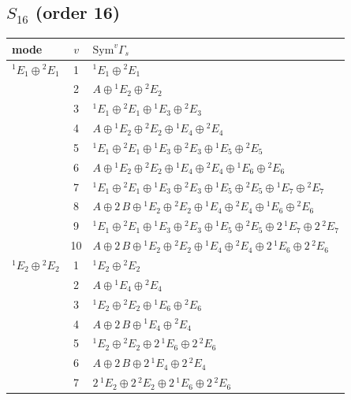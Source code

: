\documentclass[11pt]{article}
\begin{document}
\subsection*{$S_{16}$ \quad (order 16)}
\begin{longtable}{l c p{}}
\hline mode & $v$ & $\mathrm{Sym}^v\Gamma_s$\\ \hline\endhead
${}^{1}E_{1}\oplus {}^{2}E_{1}$ & 1 & ${}^{1}E_{1}\oplus {}^{2}E_{1}$\\
 & 2 & $A\oplus {}^{1}E_{2}\oplus {}^{2}E_{2}$\\
 & 3 & ${}^{1}E_{1}\oplus {}^{2}E_{1}\oplus {}^{1}E_{3}\oplus {}^{2}E_{3}$\\
 & 4 & $A\oplus {}^{1}E_{2}\oplus {}^{2}E_{2}\oplus {}^{1}E_{4}\oplus {}^{2}E_{4}$\\
 & 5 & ${}^{1}E_{1}\oplus {}^{2}E_{1}\oplus {}^{1}E_{3}\oplus {}^{2}E_{3}\oplus {}^{1}E_{5}\oplus {}^{2}E_{5}$\\
 & 6 & $A\oplus {}^{1}E_{2}\oplus {}^{2}E_{2}\oplus {}^{1}E_{4}\oplus {}^{2}E_{4}\oplus {}^{1}E_{6}\oplus {}^{2}E_{6}$\\
 & 7 & ${}^{1}E_{1}\oplus {}^{2}E_{1}\oplus {}^{1}E_{3}\oplus {}^{2}E_{3}\oplus {}^{1}E_{5}\oplus {}^{2}E_{5}\oplus {}^{1}E_{7}\oplus {}^{2}E_{7}$\\
 & 8 & $A\oplus 2\,B\oplus {}^{1}E_{2}\oplus {}^{2}E_{2}\oplus {}^{1}E_{4}\oplus {}^{2}E_{4}\oplus {}^{1}E_{6}\oplus {}^{2}E_{6}$\\
 & 9 & ${}^{1}E_{1}\oplus {}^{2}E_{1}\oplus {}^{1}E_{3}\oplus {}^{2}E_{3}\oplus {}^{1}E_{5}\oplus {}^{2}E_{5}\oplus 2\,{}^{1}E_{7}\oplus 2\,{}^{2}E_{7}$\\
 & 10 & $A\oplus 2\,B\oplus {}^{1}E_{2}\oplus {}^{2}E_{2}\oplus {}^{1}E_{4}\oplus {}^{2}E_{4}\oplus 2\,{}^{1}E_{6}\oplus 2\,{}^{2}E_{6}$\\
\hline
${}^{1}E_{2}\oplus {}^{2}E_{2}$ & 1 & ${}^{1}E_{2}\oplus {}^{2}E_{2}$\\
 & 2 & $A\oplus {}^{1}E_{4}\oplus {}^{2}E_{4}$\\
 & 3 & ${}^{1}E_{2}\oplus {}^{2}E_{2}\oplus {}^{1}E_{6}\oplus {}^{2}E_{6}$\\
 & 4 & $A\oplus 2\,B\oplus {}^{1}E_{4}\oplus {}^{2}E_{4}$\\
 & 5 & ${}^{1}E_{2}\oplus {}^{2}E_{2}\oplus 2\,{}^{1}E_{6}\oplus 2\,{}^{2}E_{6}$\\
 & 6 & $A\oplus 2\,B\oplus 2\,{}^{1}E_{4}\oplus 2\,{}^{2}E_{4}$\\
 & 7 & $2\,{}^{1}E_{2}\oplus 2\,{}^{2}E_{2}\oplus 2\,{}^{1}E_{6}\oplus 2\,{}^{2}E_{6}$\\

\end{longtable}
\end{document}

